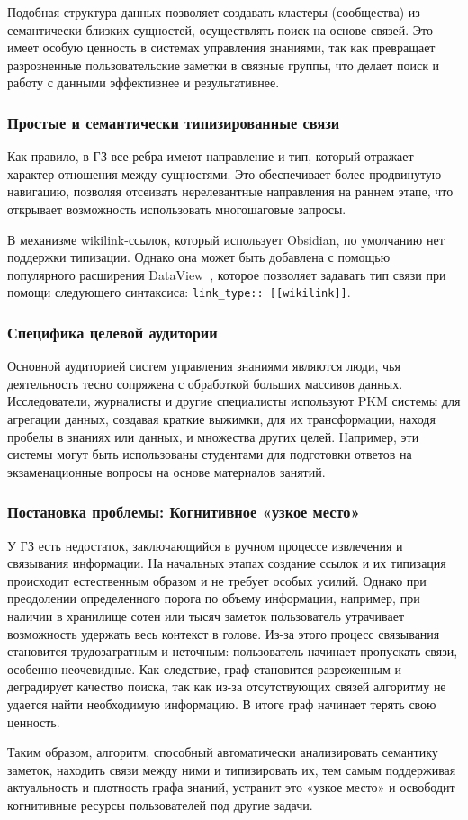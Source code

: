 Подобная структура данных позволяет создавать
кластеры (сообщества) из семантически близких сущностей,
осуществлять поиск на основе связей.
Это имеет особую ценность в системах управления знаниями, так как
превращает разрозненные пользовательские заметки в
связные группы, что делает поиск и работу с данными эффективнее и результативнее.

\subsubsection*{Простые и семантически типизированные связи}

Как правило, в ГЗ все ребра имеют направление и тип,
который отражает характер отношения между сущностями.
Это обеспечивает более продвинутую навигацию, позволяя
отсеивать нерелевантные направления на раннем этапе,
что открывает возможность использовать многошаговые запросы.

В механизме wikilink-ссылок, который использует Obsidian,
по умолчанию нет поддержки типизации.
Однако она может быть добавлена с помощью популярного расширения
DataView~\cite{dataview_plugin}, которое позволяет задавать тип связи при помощи следующего синтаксиса:
\texttt{link\_type:: [[wikilink]]}.

\subsubsection*{Специфика целевой аудитории}

Основной аудиторией систем управления знаниями
являются люди, чья деятельность
тесно сопряжена с обработкой больших массивов данных.
Исследователи, журналисты и другие специалисты
используют PKM системы для агрегации данных, создавая краткие выжимки,
для их трансформации, находя пробелы в знаниях или данных,
и множества других целей.
Например, эти системы могут быть использованы студентами
для подготовки ответов на экзаменационные вопросы на основе материалов занятий.

\subsubsection*{Постановка проблемы: Когнитивное «узкое место»}

У ГЗ есть недостаток, заключающийся в ручном процессе извлечения и связывания информации.
На начальных этапах создание ссылок и их типизация
происходит естественным образом и не требует особых усилий.
Однако при преодолении определенного порога по объему информации,
например, при наличии в хранилище сотен или тысяч заметок
пользователь утрачивает возможность удержать весь контекст в голове.
Из-за этого процесс связывания становится трудозатратным и неточным:
пользователь начинает пропускать связи, особенно неочевидные.
Как следствие, граф становится разреженным и деградирует качество поиска, так как
из-за отсутствующих связей алгоритму не удается найти необходимую информацию.
В итоге граф начинает терять свою ценность.

Таким образом, алгоритм, способный автоматически
анализировать семантику заметок, находить связи между ними
и типизировать их, тем самым поддерживая актуальность и плотность
графа знаний, устранит это «узкое место»
и освободит когнитивные ресурсы пользователей под другие задачи.
